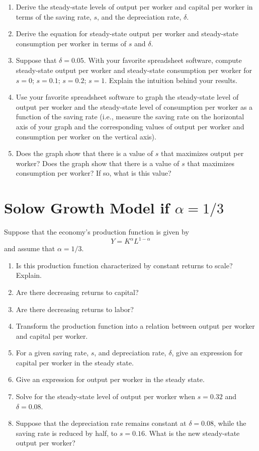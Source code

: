 \documentclass[]{book}
\theoremstyle{definition}
\theoremstyle{definition}
\theoremstyle{definition}
\theoremstyle{remark}
\begin{document}
\begin{enumerate}
\def\labelenumi{\arabic{enumi}.}
\item
  Derive the steady-state levels of output per worker and capital per
  worker in terms of the saving rate, \(s\), and the depreciation rate,
  \(\delta\).
\item
  Derive the equation for steady-state output per worker and
  steady-state consumption per worker in terms of \(s\) and \(\delta\).
\item
  Suppose that \(\delta=0.05\). With your favorite spreadsheet software,
  compute steady-state output per worker and steady-state consumption
  per worker for \(s=0\); \(s=0.1\); \(s=0.2\); \(s=1\). Explain the
  intuition behind your results.
\item
  Use your favorite spreadsheet software to graph the steady-state level
  of output per worker and the steady-state level of consumption per
  worker as a function of the saving rate (i.e., measure the saving rate
  on the horizontal axis of your graph and the corresponding values of
  output per worker and consumption per worker on the vertical axis).
\item
  Does the graph show that there is a value of \(s\) that maximizes
  output per worker? Does the graph show that there is a value of \(s\)
  that maximizes consumption per worker? If so, what is this value?
\end{enumerate}

\section{\texorpdfstring{Solow Growth Model if
\(\alpha = 1/3\)}{Solow Growth Model if \textbackslash{}alpha = 1/3}}\label{solow-growth-model-if-alpha-13}

Suppose that the economy's production function is given by
\[Y=K^{\alpha}L^{1-\alpha}\] and assume that \(\alpha=1/3\).

\begin{enumerate}
\def\labelenumi{\arabic{enumi}.}
\item
  Is this production function characterized by constant returns to
  scale? Explain.
\item
  Are there decreasing returns to capital?
\item
  Are there decreasing returns to labor?
\item
  Transform the production function into a relation between output per
  worker and capital per worker.
\item
  For a given saving rate, \(s\), and depreciation rate, \(\delta\),
  give an expression for capital per worker in the steady state.
\item
  Give an expression for output per worker in the steady state.
\item
  Solve for the steady-state level of output per worker when \(s=0.32\)
  and \(\delta=0.08\).
\item
  Suppose that the depreciation rate remains constant at
  \(\delta=0.08\), while the saving rate is reduced by half, to
  \(s=0.16\). What is the new steady-state output per worker?
\end{enumerate}
\end{document}
